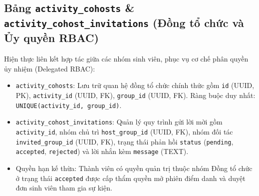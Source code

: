 \subsection{Bảng \texttt{activity\_cohosts} \& \texttt{activity\_cohost\_invitations} (Đồng tổ chức và Ủy quyền RBAC)}
Hiện thực liên kết hợp tác giữa các nhóm sinh viên, phục vụ cơ chế phân quyền ủy nhiệm (Delegated RBAC):
\begin{itemize}[leftmargin=*, noitemsep, topsep=1pt]
    \item \texttt{activity\_cohosts}: Lưu trữ quan hệ đồng tổ chức chính thức gồm \texttt{id} (UUID, PK), \texttt{activity\_id} (UUID, FK), \texttt{group\_id} (UUID, FK). Ràng buộc duy nhất: \texttt{UNIQUE(activity\_id, group\_id)}.
    \item \texttt{activity\_cohost\_invitations}: Quản lý quy trình gửi lời mời gồm \texttt{activity\_id}, nhóm chủ trì \texttt{host\_group\_id} (UUID, FK), nhóm đối tác \texttt{invited\_group\_id} (UUID, FK), trạng thái phản hồi \texttt{status} (\texttt{pending}, \texttt{accepted}, \texttt{rejected}) và lời nhắn kèm \texttt{message} (TEXT).
    \item Quyền hạn kế thừa: Thành viên có quyền quản trị thuộc nhóm Đồng tổ chức ở trạng thái \texttt{accepted} được cấp thẩm quyền mở phiên điểm danh và duyệt đơn sinh viên tham gia sự kiện.
\end{itemize}


